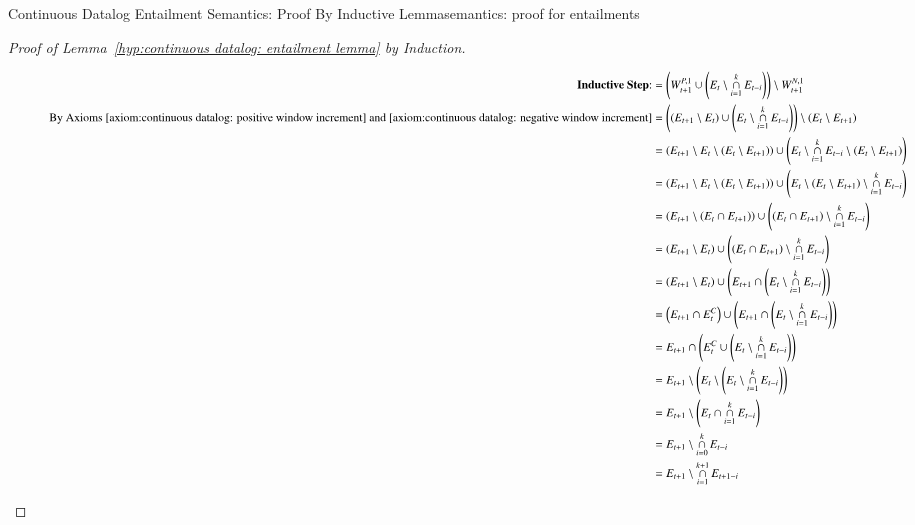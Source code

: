 \begin{nestedsection}{Continuous Datalog Entailment Semantics: Proof By Inductive Lemma}{semantics: proof for entailments}
\begin{proof}[Proof of Lemma~\ref{hyp:continuous datalog: entailment lemma} by Induction]
\begin{figure}[p]
\begin{align*}
				\text{\textbf{Inductive Step}:}& = \left( W^{P,1}_{t+1} \cup \left( E_t \setminus \mathop{\cap}^{k}_{i=1} E_{t-i} \right) \right) \setminus W^{N,1}_{t+1} \\
				\text{By Axioms~\ref{axiom:continuous datalog: positive window increment}~and~\ref{axiom:continuous datalog: negative window increment}} & = \left( \left( E_{t+1} \setminus E_{t} \right) \cup \left( E_t \setminus \mathop{\cap}^{k}_{i=1} E_{t-i} \right) \right) \setminus \left( E_{t} \setminus E_{t+1} \right) \\
				& = \left( E_{t+1} \setminus E_{t} \setminus \left( E_{t} \setminus E_{t+1} \right) \right) \cup \left( E_t \setminus \mathop{\cap}^{k}_{i=1} E_{t-i} \setminus \left( E_{t} \setminus E_{t+1} \right) \right) \\
				& = \left( E_{t+1} \setminus E_{t} \setminus \left( E_{t} \setminus E_{t+1} \right) \right) \cup \left( E_t \setminus \left( E_{t} \setminus E_{t+1} \right) \setminus \mathop{\cap}^{k}_{i=1} E_{t-i} \right) \\
				& = \left( E_{t+1} \setminus \left( E_{t} \cap E_{t+1} \right) \right) \cup \left( \left( E_t \cap E_{t+1} \right) \setminus \mathop{\cap}^{k}_{i=1} E_{t-i} \right) \\
				& = \left( E_{t+1} \setminus E_{t} \right) \cup \left( \left( E_t \cap E_{t+1} \right) \setminus \mathop{\cap}^{k}_{i=1} E_{t-i} \right) \\
				& = \left( E_{t+1} \setminus E_{t} \right) \cup \left( E_{t+1} \cap \left( E_{t} \setminus \mathop{\cap}^{k}_{i=1} E_{t-i} \right) \right) \\
				& = \left( E_{t+1} \cap E^C_{t} \right) \cup \left( E_{t+1} \cap \left( E_{t} \setminus \mathop{\cap}^{k}_{i=1} E_{t-i} \right) \right)\\
				& = E_{t+1} \cap \left( E^C_{t} \cup \left( E_{t} \setminus \mathop{\cap}^{k}_{i=1} E_{t-i} \right) \right) \\
				& = E_{t+1} \setminus \left( E_{t} \setminus \left( E_{t} \setminus \mathop{\cap}^{k}_{i=1} E_{t-i} \right) \right) \\
				& = E_{t+1} \setminus \left( E_{t} \cap \mathop{\cap}^{k}_{i=1} E_{t-i} \right) \\
				& = E_{t+1} \setminus \mathop{\cap}^{k}_{i=0} E_{t-i} \\
				& = E_{t+1} \setminus \mathop{\cap}^{k+1}_{i=1} E_{t+1-i} \qedhere
			\end{align*}
		\end{figure}
	\end{proof}
\end{nestedsection}
